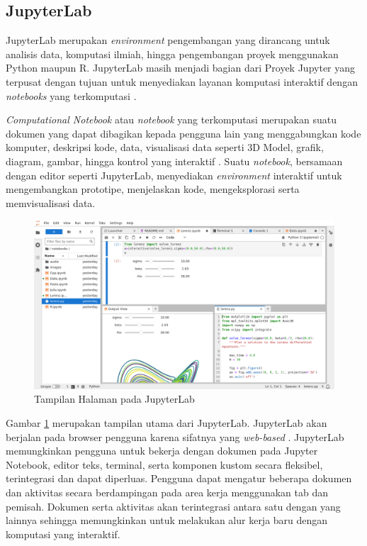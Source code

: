 \subsection{JupyterLab}

JupyterLab merupakan \emph{environment} pengembangan yang dirancang untuk analisis data, komputasi ilmiah, hingga pengembangan proyek menggunakan Python maupun R. JupyterLab masih menjadi bagian dari Proyek Jupyter yang terpusat dengan tujuan untuk menyediakan layanan komputasi interaktif dengan \emph{notebooks} yang terkomputasi \parencite{Jupyter_2023}. 

\emph{Computational Notebook} atau \emph{notebook} yang terkomputasi merupakan suatu dokumen yang dapat dibagikan kepada pengguna lain yang menggabungkan kode komputer, deskripsi kode, data, visualisasi data seperti 3D Model, grafik, diagram, gambar, hingga kontrol yang interaktif \parencite{Team_2015}. Suatu \emph{notebook}, bersamaan dengan editor seperti JupyterLab, menyediakan \emph{environment} interaktif untuk mengembangkan prototipe, menjelaskan kode, mengeksplorasi serta memvisualisasi data. 

\newpage
\begin{figure} [ht] \centering
    \includegraphics[scale=0.35]{gambar/JupyterLab.png}
    \caption{Tampilan Halaman pada JupyterLab}
    \label{fig:JupyterLab}
\end{figure}

Gambar \ref{fig:JupyterLab} merupakan tampilan utama dari JupyterLab. JupyterLab akan berjalan pada browser pengguna karena sifatnya yang \emph{web-based} \parencite{Jupyter_2023b}. JupyterLab memungkinkan pengguna untuk bekerja dengan dokumen pada Jupyter Notebook, editor teks, terminal, serta komponen kustom secara fleksibel, terintegrasi dan dapat diperluas. Pengguna dapat mengatur beberapa dokumen dan aktivitas secara berdampingan pada area kerja menggunakan tab dan pemisah. Dokumen serta aktivitas akan terintegrasi antara satu dengan yang lainnya sehingga memungkinkan untuk melakukan alur kerja baru dengan komputasi yang interaktif.

